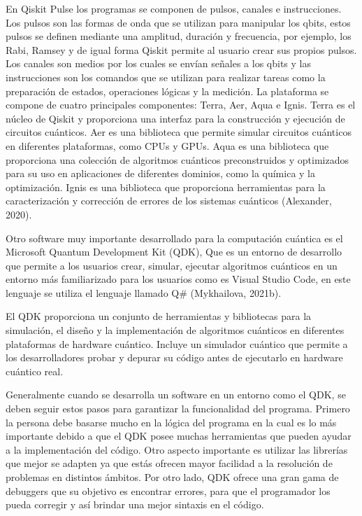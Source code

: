 \documentclass{article}
\begin{document}
En Qiskit Pulse los programas se componen de pulsos, canales e instrucciones. Los pulsos son las formas de onda que se utilizan para manipular los qbits, estos pulsos se definen mediante una amplitud, duración y frecuencia, por ejemplo, los Rabi, Ramsey y de igual forma Qiskit permite al usuario crear sus propios pulsos. Los canales son medios por los cuales se envían señales a los qbits y las instrucciones son los comandos que se utilizan para realizar tareas como la preparación de estados, operaciones lógicas y la medición.
La plataforma se compone de cuatro principales componentes: Terra, Aer, Aqua e Ignis. Terra es el núcleo de Qiskit y proporciona una interfaz para la construcción y ejecución de circuitos cuánticos. Aer es una biblioteca que permite simular circuitos cuánticos en diferentes plataformas, como CPUs y GPUs. Aqua es una biblioteca que proporciona una colección de algoritmos cuánticos preconstruidos y optimizados para su uso en aplicaciones de diferentes dominios, como la química y la optimización. Ignis es una biblioteca que proporciona herramientas para la caracterización y corrección de errores de los sistemas cuánticos (Alexander, 2020). 

Otro software muy importante desarrollado para la computación cuántica es el Microsoft Quantum Development Kit (QDK), Que es un entorno de desarrollo que permite a los usuarios crear, simular, ejecutar algoritmos cuánticos en un entorno más familiarizado para los usuarios como es Visual Studio Code, en este lenguaje se utiliza el lenguaje llamado Q\# (Mykhailova, 2021b).

El QDK proporciona un conjunto de herramientas y bibliotecas para la simulación, el diseño y la implementación de algoritmos cuánticos en diferentes plataformas de hardware cuántico. Incluye un simulador cuántico que permite a los desarrolladores probar y depurar su código antes de ejecutarlo en hardware cuántico real. 

Generalmente cuando se desarrolla un software en un entorno como el QDK, se deben seguir estos pasos para garantizar la funcionalidad del programa. Primero la persona debe basarse mucho en la lógica del programa en la cual es lo más importante debido a que el QDK posee muchas herramientas que pueden ayudar a la implementación del código. Otro aspecto importante es utilizar las librerías que mejor se adapten ya que estás ofrecen mayor facilidad a la resolución de problemas en distintos ámbitos. Por otro lado, QDK ofrece una gran gama de debuggers que su objetivo es encontrar errores, para que el programador los pueda corregir y así brindar una mejor sintaxis en el código.  
\end{document}

